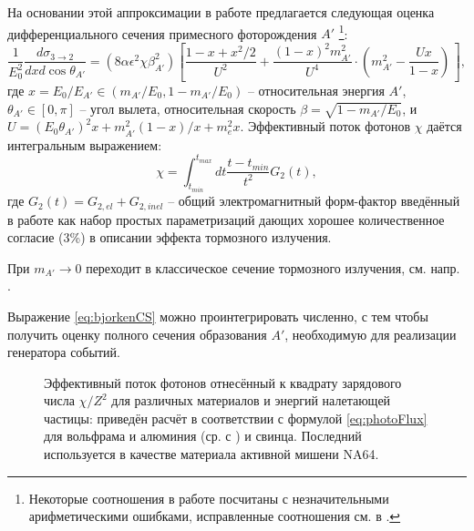 На основании этой аппроксимации
в работе \cite{bjorken} предлагается следующая оценка
дифференциального сечения примесного
фоторождения $A'$ \footnote{Некоторые соотношения в работе \cite{bjorken}
посчитаны с незначительными арифметическими ошибками, исправленные
соотношения см. в \cite{andreas2012}.}:
\begin{equation}
    \frac{1}{E^2_0} \frac{ d \sigma_{3 \rightarrow 2}}{d x d \cos{\theta_{A'}}} =
(8 \alpha \epsilon^2 \chi \beta_{A'}^2) \left[
    \frac{ 1 - x + x^2/2 }{U^2} + 
    \frac{ (1-x)^2 m^2_{A'} }{U^4} \cdot
        ( m^2_{A'} - \frac{U x}{1 - x} )
        \frac{}{}
\right],
    \label{eq:bjorkenCS}
\end{equation}
где $x = E_0/E_{A'} \in (m_{A'}/E_0, 1 - m_{A'}/E_0)$ -- относительная энергия
$A'$, $\theta_{A'} \in [0, \pi]$ -- угол вылета, относительная скорость
$\beta = \sqrt{ 1 - m_{A'}/E_0 }$, и
$U = (E_0 \theta_{A'} )^2 x + m^2_{A'} (1-x)/x + m_e^2 x$.
Эффективный поток фотонов $\chi$ даётся интегральным выражением:
\begin{equation}
\chi = \int_{t_{min}}^{t_{max}} d t \frac{t - t_{min}}{t^2} G_2 (t),
\label{eq:photoFlux}
\end{equation}
где $G_2(t) = G_{2, el} + G_{2, inel}$ -- общий электромагнитный форм-фактор
введённый в работе \cite{KimTsaiWWReview} как набор простых параметризаций
дающих хорошее количественное согласие (3\%) в описании эффекта тормозного
излучения.

При $m_{A'} \rightarrow 0$ переходит в классическое сечение тормозного
излучения, см. напр. \cite{bremsref}.

Выражение \eqref{eq:bjorkenCS} можно
проинтегрировать численно, с тем чтобы получить оценку полного
сечения образования $A'$, необходимую для реализации генератора событий.

\begin{figure}
    \centering
    
    \caption{ Эффективный поток фотонов отнесённый к квадрату зарядового числа
$\chi/Z^2$ для различных материалов и энергий налетающей частицы: приведён
расчёт в соответствии с формулой \eqref{eq:photoFlux} для вольфрама и алюминия
(ср. с \cite{bjorken}) и свинца. Последний используется в качестве материала
активной мишени NA64. }
\end{figure}

